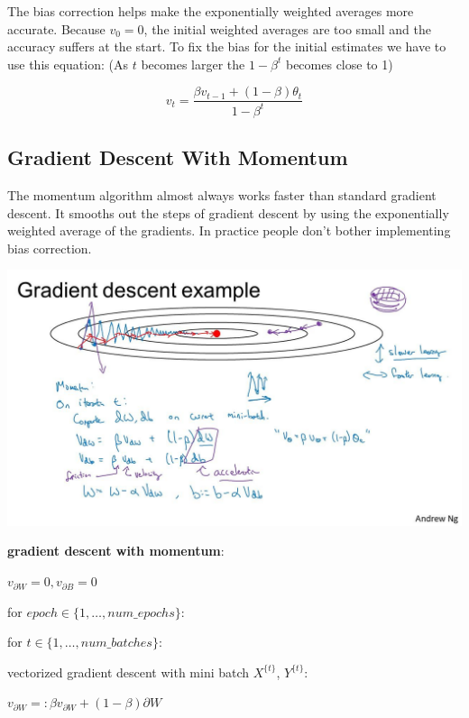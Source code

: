 \documentclass{article}
\begin{document}
\noindent The bias correction helps make the exponentially weighted averages more accurate. Because \(v_{0} = 0\), the initial weighted averages are too small and the accuracy suffers at the start. To fix the bias for the initial estimates we have to use this equation: (As \(t\) becomes larger the \(1 - \beta^{t}\) becomes close to 1)

\[v_{t} = \frac{\beta v_{t - 1} + (1 - \beta) \theta_{t}}{1 - \beta^{t}}\]

\subsection{Gradient Descent With Momentum}

\noindent The momentum algorithm almost always works faster than standard gradient descent. It smooths out the steps of gradient descent by using the exponentially weighted average of the gradients. In practice people don't bother implementing bias correction.

\begin{center}
\includegraphics[scale=0.2]{./images/momentum_gradient_descent.jpg}
\end{center}

\noindent \textbf{gradient descent with momentum}:

\noindent \(v_{\partial W} = 0, v_{\partial B} = 0\)

\noindent for \(epoch \in \{1, \dots, num\_epochs\}\):

\noindent \hspace{.5cm} for \(t \in \{1, \dots, num\_batches\}\):

\noindent \hspace{1cm} vectorized gradient descent with mini batch \(X^{\{t\}}\), \(Y^{\{t\}}\):

\noindent \hspace{1cm} \(v_{\partial W} =: \beta v_{\partial W} + (1 - \beta) \partial W\)
\end{document}

